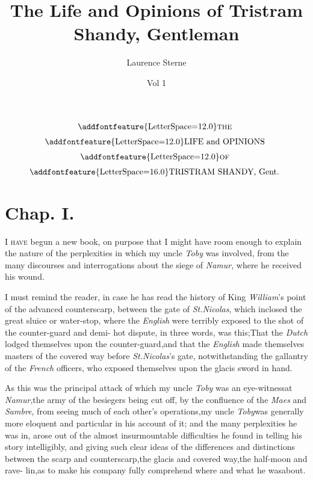 \documentclass{article}
\title{The Life and Opinions of Tristram Shandy, Gentleman}
\author{Laurence Sterne}
\date{Vol 1}
\begin{document}
\pagestyle{fancy}
\thispagestyle{empty}
\[\vbox{\openup 6pt\halign{\hss # \hss\cr
\addfontfeature{LetterSpace=12.0}\textsc{the}\cr
\addfontfeature{LetterSpace=12.0}LIFE and OPINIONS\cr
\addfontfeature{LetterSpace=12.0}\textsc{of}\cr
{\addfontfeature{LetterSpace=16.0}TRISTRAM SHANDY}, Gent.\cr}}\]

\vskip 6pt
\setlength{\baselineskip}{14pt}  %

\section{Chap. I.}

\lettrine{I}{ have} begun a new book, on purpose that I might
have room enough to explain the nature of the perplexities in
which my uncle \textit{Toby} was involved, from the many
discourses and interrogations about the siege of \textit{Namur},
where he received his wound.

I must remind the reader, in case he has read the history of
King \textit{William}’s\pb 
{}
point of the advanced counterscarp,
be\-tween the gate of \textit{St.\@ Nicolas}, which inclo\-sed the
great sluice or water-stop, where the \textit{English} were
terribly exposed to the shot of the counter-guard and
demi-\break
{}
hot dispute, in three words, was this;\break That the \textit{Dutch}
lodged themselves upon the counter-guard,\tsk and that the
\textit{English} made themselves masters of the covered way
before \textit{St.\@ Nicolas}'s gate, notwithstanding the gallantry
of the \textit{French} offi\-cers, who exposed themselves upon the\break
glacis sword in hand.

As this was the principal attack of which my uncle \textit{Toby}
was an eye-witness\pb at \textit{Namur},\tsh the army of the
besiegers being cut off, by the confluence of the \textit{Maes}
and \textit{Sambre}, from seeing much of each other’s
operations,\tsk my uncle \textit{Toby}\break was generally more
eloquent and particular in his account of it; and the many
perplexities he was in, arose out of the\break
almost insurmountable difficulties he\break
found in telling his story intelligibly,\break
and giving such clear ideas of the differences and distinctions
between the scarp and counterscarp,\tsh the glacis and
covered way,\tsh the half-moon and rave-\break
lin,\tsh as to make his company fully\break
comprehend where and what he was\break about.
\end{document}
